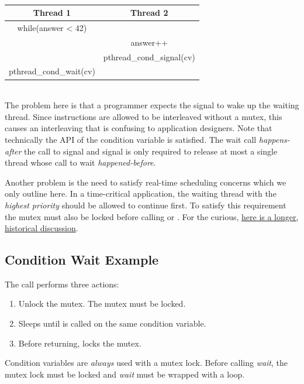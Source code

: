 \\
\begin{center}
\begin{tabular}{|c|c|}
  Thread 1 & Thread 2 \\ \hline
  while(answer < 42) & \\
  & answer++ \\
  & pthread\_cond\_signal(cv) \\
  pthread\_cond\_wait(cv)
\end{tabular}
\end{center}
\\
The problem here is that a programmer expects the signal to wake up the waiting thread.
Since instructions are allowed to be interleaved without a mutex, this causes an interleaving that is confusing to application designers.
Note that technically the API of the condition variable is satisfied.
The wait call \textit{happens-after} the call to signal and signal is only required to release at most a single thread whose call to wait \textit{happened-before}.

Another problem is the need to satisfy real-time scheduling concerns which we only outline here.
In a time-critical application, the waiting thread with the \emph{highest priority} should be allowed to continue first.
To satisfy this requirement the mutex must also be locked before calling  or .
For the curious, \href{https://groups.google.com/forum/?hl=ky\#!msg/comp.programming.threads/wEUgPq541v8/ZByyyS8acqMJ}{here is a longer, historical discussion}.

\subsection{Condition Wait Example}

The call  performs three actions:

\begin{enumerate}
\item Unlock the mutex. The mutex must be locked.
\item Sleeps until  is called on the same condition variable.
\item Before returning, locks the mutex.
\end{enumerate}

Condition variables are \emph{always} used with a mutex lock.
Before calling \emph{wait}, the mutex lock must be locked and \emph{wait} must be wrapped with a loop.


